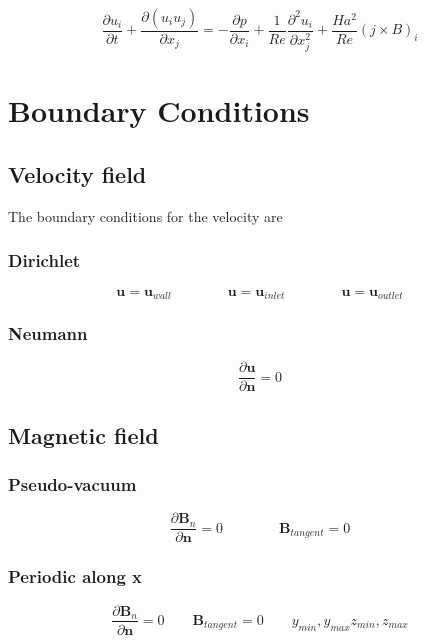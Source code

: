 \documentclass[11pt]{article}
\begin{document}
\begin{equation}
	\frac{\partial u_i}{\partial t} + 
	\frac{\partial (u_i u_j)}{\partial x_j}
	= 
	- \frac{\partial p}{\partial x_i}
	+ \frac{1}{Re}
	\frac{\partial^2 u_i}{\partial x_j^2}
	+ \frac{Ha^2}{Re}
	(j \times B)_i
\end{equation}



\section{Boundary Conditions}

\subsection{Velocity field}
The boundary conditions for the velocity are 

\subsubsection{Dirichlet}

\begin{equation}
	\pmb{u} = \pmb{u}_{wall}
	\qquad \qquad
	\pmb{u} = \pmb{u}_{inlet}
	\qquad \qquad
	\pmb{u} = \pmb{u}_{outlet}
\end{equation}

\subsubsection{Neumann}
\begin{equation}
	\frac{\partial \pmb{u}}{\partial \pmb{n}} = 0
\end{equation}

\subsection{Magnetic field}
\subsubsection{Pseudo-vacuum}
\begin{equation}
	\frac{\partial \pmb{B}_{n}}{\partial \pmb{n}} = 0
	\qquad \qquad
	\pmb{B}_{tangent} = 0
\end{equation}

\subsubsection{Periodic along x}
\begin{equation}
	\frac{\partial \pmb{B}_{n}}{\partial \pmb{n}} = 0
	\qquad
	\pmb{B}_{tangent} = 0
	\qquad
	y_{min},y_{max}
	z_{min},z_{max}
\end{equation}
\end{document}
